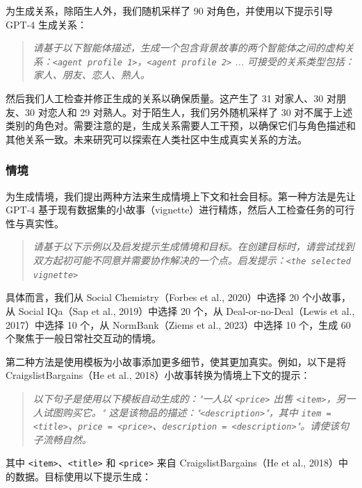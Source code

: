 \documentclass[11pt,a4paper]{article}
\begin{document}
为生成关系，除陌生人外，我们随机采样了 90 对角色，并使用以下提示引导 GPT-4 生成关系：

\begin{quote}
\small\itshape 请基于以下智能体描述，生成一个包含背景故事的两个智能体之间的虚构关系：\texttt{<agent profile 1>}，\texttt{<agent profile 2>} ... 可接受的关系类型包括：家人、朋友、恋人、熟人。
\end{quote}

然后我们人工检查并修正生成的关系以确保质量。这产生了 31 对家人、30 对朋友、30 对恋人和 29 对熟人。对于陌生人，我们另外随机采样了 30 对不属于上述类别的角色对。需要注意的是，生成关系需要人工干预，以确保它们与角色描述和其他关系一致。未来研究可以探索在人类社区中生成真实关系的方法。

\subsubsection*{情境}

为生成情境，我们提出两种方法来生成情境上下文和社会目标。第一种方法是先让 GPT-4 基于现有数据集的小故事（vignette）进行精炼，然后人工检查任务的可行性与真实性。

\begin{quote}
\small\itshape 请基于以下示例以及启发提示生成情境和目标。在创建目标时，请尝试找到双方起初可能不同意并需要协作解决的一个点。启发提示：\texttt{<the selected vignette>}
\end{quote}

具体而言，我们从 Social Chemistry（Forbes et al., 2020）中选择 20 个小故事，从 Social IQa（Sap et al., 2019）中选择 20 个，从 Deal-or-no-Deal（Lewis et al., 2017）中选择 10 个，从 NormBank（Ziems et al., 2023）中选择 10 个，生成 60 个聚焦于一般日常社交互动的情境。

第二种方法是使用模板为小故事添加更多细节，使其更加真实。例如，以下是将 CraigslistBargains（He et al., 2018）小故事转换为情境上下文的提示：

\begin{quote}
\small\itshape 以下句子是使用以下模板自动生成的："一人以 \texttt{<price>} 出售 \texttt{<item>}，另一人试图购买它。" 这是该物品的描述："\texttt{<description>}"，其中 \texttt{item = <title>}、\texttt{price = <price>}、\texttt{description = <description>}"。请使该句子流畅自然。
\end{quote}

其中 \texttt{<item>}、\texttt{<title>} 和 \texttt{<price>} 来自 CraigslistBargains（He et al., 2018）中的数据。目标使用以下提示生成：
\end{document}
